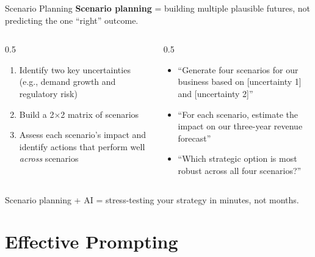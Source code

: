 \documentclass[aspectratio=169]{beamer}
\begin{document}
\begin{frame}{Scenario Planning}
\textbf{Scenario planning} = building multiple plausible futures, not predicting the one ``right'' outcome.
\vspace{0.3cm}
\begin{columns}[T]
\begin{column}{0.5\textwidth}
\begin{shadedbox}[title=\textbf{The Approach}]
\begin{enumerate}\small
  \item Identify two key uncertainties (e.g., demand growth and regulatory risk)
  \item Build a 2$\times$2 matrix of scenarios
  \item Assess each scenario's impact and identify actions that perform well \textit{across} scenarios
\end{enumerate}
\end{shadedbox}
\end{column}
\begin{column}{0.5\textwidth}
\begin{shadedbox}[title=\textbf{AI's Role}]
\begin{itemize}\small
  \item ``Generate four scenarios for our business based on [uncertainty 1] and [uncertainty 2]''
  \item ``For each scenario, estimate the impact on our three-year revenue forecast''
  \item ``Which strategic option is most robust across all four scenarios?''
\end{itemize}
\end{shadedbox}
\end{column}
\end{columns}
\vspace{0.3cm}
Scenario planning + AI = stress-testing your strategy in minutes, not months.
\end{frame}

\section{Effective Prompting}
\end{document}

